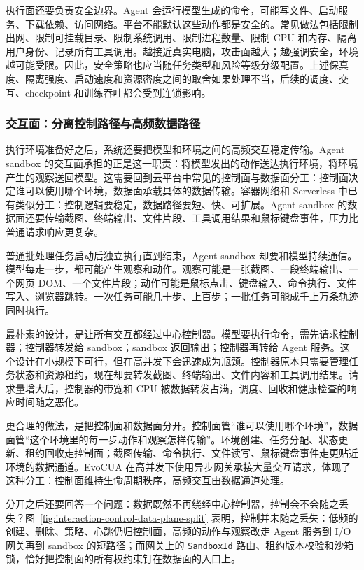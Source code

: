 执行面还要负责安全边界。Agent 会运行模型生成的命令，可能写文件、启动服务、下载依赖、访问网络。平台不能默认这些动作都是安全的。常见做法包括限制出网、限制可挂载目录、限制系统调用、限制进程数量、限制 CPU 和内存、隔离用户身份、记录所有工具调用。越接近真实电脑，攻击面越大；越强调安全，环境越可能受限。因此，安全策略也应当随任务类型和风险等级分级配置。上述保真度、隔离强度、启动速度和资源密度之间的取舍如果处理不当，后续的调度、交互、checkpoint 和训练吞吐都会受到连锁影响。

\subsubsection{交互面：分离控制路径与高频数据路径}
\label{sec6:agent-interaction-plane}

执行环境准备好之后，系统还要把模型和环境之间的高频交互稳定传输。Agent sandbox 的交互面承担的正是这一职责：将模型发出的动作送达执行环境，将环境产生的观察送回模型。这需要回到云平台中常见的控制面与数据面分工：控制面决定谁可以使用哪个环境，数据面承载具体的数据传输。容器网络和 Serverless 中已有类似分工：控制逻辑要稳定，数据路径要短、快、可扩展。Agent sandbox 的数据面还要传输截图、终端输出、文件片段、工具调用结果和鼠标键盘事件，压力比普通请求响应更复杂。

普通批处理任务启动后独立执行直到结束，Agent sandbox 却要和模型持续通信。模型每走一步，都可能产生观察和动作。观察可能是一张截图、一段终端输出、一个网页 DOM、一个文件片段；动作可能是鼠标点击、键盘输入、命令执行、文件写入、浏览器跳转。一次任务可能几十步、上百步；一批任务可能成千上万条轨迹同时执行。

最朴素的设计，是让所有交互都经过中心控制器。模型要执行命令，需先请求控制器；控制器转发给 sandbox；sandbox 返回输出；控制器再转给 Agent 服务。这个设计在小规模下可行，但在高并发下会迅速成为瓶颈。控制器原本只需要管理任务状态和资源租约，现在却要转发截图、终端输出、文件内容和工具调用结果。请求量增大后，控制器的带宽和 CPU 被数据转发占满，调度、回收和健康检查的响应时间随之恶化。

更合理的做法，是把控制面和数据面分开。控制面管“谁可以使用哪个环境”，数据面管“这个环境里的每一步动作和观察怎样传输”。环境创建、任务分配、状态更新、租约回收走控制面；截图传输、命令执行、文件读写、鼠标键盘事件走更贴近环境的数据通道。EvoCUA 在高并发下使用异步网关承接大量交互请求，体现了这种分工：控制面维持生命周期秩序，高频交互由数据通道处理。

分开之后还要回答一个问题：数据既然不再绕经中心控制器，控制会不会随之丢失？图~\ref{fig:interaction-control-data-plane-split} 表明，控制并未随之丢失：低频的创建、删除、策略、心跳仍归控制面，高频的动作与观察改走 Agent 服务到 I/O 网关再到 sandbox 的短路径；而网关上的 \texttt{SandboxId} 路由、租约版本校验和沙箱锁，恰好把控制面的所有权约束钉在数据面的入口上。

